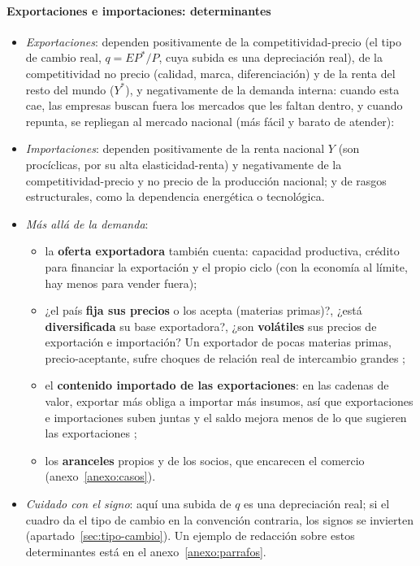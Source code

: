 \documentclass[11pt]{article}
\begin{document}
\paragraph{Exportaciones e importaciones: determinantes}
\begin{itemize}
\item \emph{Exportaciones}: dependen positivamente de la competitividad-precio (el tipo de cambio real, $q=EP^*/P$, cuya subida es una depreciación real), de la competitividad no precio (calidad, marca, diferenciación) y de la renta del resto del mundo ($Y^*$), y negativamente de la demanda interna: cuando esta cae, las empresas buscan fuera los mercados que les faltan dentro, y cuando repunta, se repliegan al mercado nacional (más fácil y barato de atender):
\item \emph{Importaciones}: dependen positivamente de la renta nacional $Y$ (son procíclicas, por su alta elasticidad-renta) y negativamente de la competitividad-precio y no precio de la producción nacional; y de rasgos estructurales, como la dependencia energética o tecnológica.
\item \emph{Más allá de la demanda}:
  \begin{itemize}
  \item la \textbf{oferta exportadora} también cuenta: capacidad productiva, crédito para financiar la exportación y el propio ciclo (con la economía al límite, hay menos para vender fuera);
  \item ¿el país \textbf{fija sus precios} o los acepta (materias primas)?, ¿está \textbf{diversificada} su base exportadora?, ¿son \textbf{volátiles} sus precios de exportación e importación? Un exportador de pocas materias primas, precio-aceptante, sufre choques de relación real de intercambio grandes \parencite{FMI2022edXFPP};
  \item el \textbf{contenido importado de las exportaciones}: en las cadenas de valor, exportar más obliga a importar más insumos, así que exportaciones e importaciones suben juntas y el saldo mejora menos de lo que sugieren las exportaciones \parencite{OCDE2023TiVA};
  \item los \textbf{aranceles} propios y de los socios, que encarecen el comercio (anexo~\ref{anexo:casos}).
  \end{itemize}
\item \emph{Cuidado con el signo}: aquí una subida de $q$ es una depreciación real; si el cuadro da el tipo de cambio en la convención contraria, los signos se invierten (apartado~\ref{sec:tipo-cambio}). Un ejemplo de redacción sobre estos determinantes está en el anexo~\ref{anexo:parrafos}.
\end{itemize}
\end{document}

